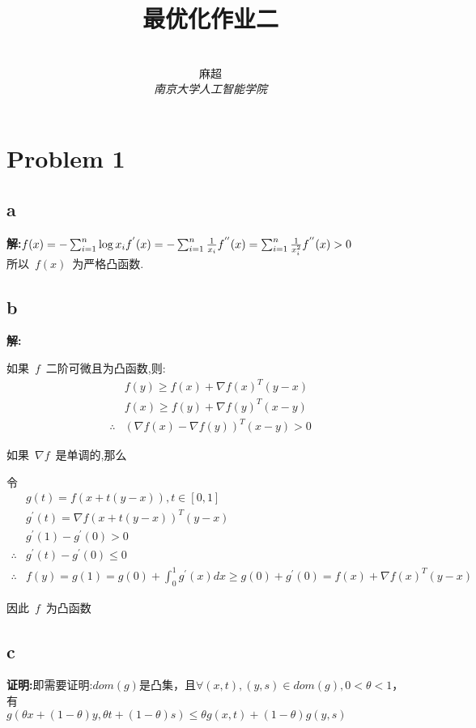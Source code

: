 \documentclass[12pt,a4paper,fontset=none]{ctexart}
\title{\textbf{最优化作业二}}
\author{
\\
\Large{麻超 \quad 201300066}
\\[6pt]
{ \large \textit{南京大学人工智能学院}}\\[2pt]
}
\begin{document}
\maketitle
\setcounter{page}{1}
\section{Problem 1}
\subsection{a}
\textbf{解:}$\\
	f(x)=-\sum_{i=1}^{n}\log x_i\\
	f^{'}(x)=-\sum_{i=1}^{n}\frac{1}{x_i}\\
	f^{''}(x)=\sum_{i=1}^{n}\frac{1}{x_i^2}\\
	f^{''}(x)>0$\\
所以~$f(x)$~为严格凸函数.
\subsection{b}
\textbf{解:}

如果~$f$~二阶可微且为凸函数,则:
\begin{align*}
	           & f(y)\geq f(x)+\nabla f(x)^T(y-x)   \\
	           & f(x)\geq f(y)+\nabla f(y)^T(x-y)   \\
	\therefore & (\nabla f(x)-\nabla f(y))^T(x-y)>0
\end{align*}


如果~$\nabla f$~是单调的,那么

令\begin{align*}
	           & g(t)=f(x+t(y-x)),t\in [0,1]                                                   \\
	           & g^{'}(t)=\nabla f(x+t(y-x))^T(y-x)                                            \\
	           & g^{'}(1)-g^{'}(0)>0                                                           \\
	\therefore & g^{'}(t)-g^{'}(0)\leq 0                                                       \\
	\therefore & f(y)=g(1)=g(0)+\int_0^1 g^{'}(x) dx\geq g(0)+g^{'}(0)=f(x)+\nabla f(x)^T(y-x)
\end{align*}

因此~$f$~为凸函数
\subsection{c}
\textbf{证明:}即需要证明:$dom(g)$是凸集，且$\forall (x,t),(y,s)\in dom(g),0<\theta<1$，有\\
$g(\theta x+(1-\theta)y,\theta t+(1-\theta)s)\leq \theta g(x,t)+(1-\theta)g(y,s)$
\end{document}
